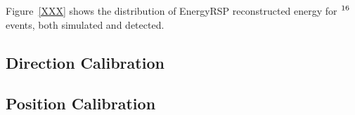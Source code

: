 Figure~\ref{XXX} shows the  distribution of EnergyRSP reconstructed energy for
$\ce{^{16}}$ events, both simulated and detected.
\subsection{Direction Calibration}
\subsection{Position Calibration}
